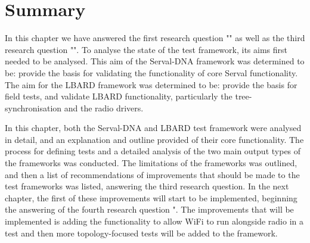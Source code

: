 \section{Summary}
In this chapter we have answered the first research question "\firstRQ" as well as the third research question "\thirdRQ".
To analyse the state of the test framework, its aims first needed to be analysed. 
This aim of the Serval-DNA framework was determined to be: provide the basis for validating the functionality of core Serval functionality.
The aim for the LBARD framework was determined to be: provide the basis for field tests, and validate LBARD functionality, particularly the tree-synchronisation and the radio drivers.

In this chapter, both the Serval-DNA and LBARD test framework were analysed in detail, and an explanation and outline provided of their core functionality.
The process for defining tests and a detailed analysis of the two main output types of the frameworks was conducted.
The limitations of the frameworks was outlined, and then a list of recommendations of improvements that should be made to the test frameworks was listed, answering the third research question.
In the next chapter, the first of these improvements will start to be implemented, beginning the answering of the fourth research question "\fourthRQ.
The improvements that will be implemented is adding the functionality to allow WiFi to run alongside radio in a test and then more topology-focused tests will be added to the framework.